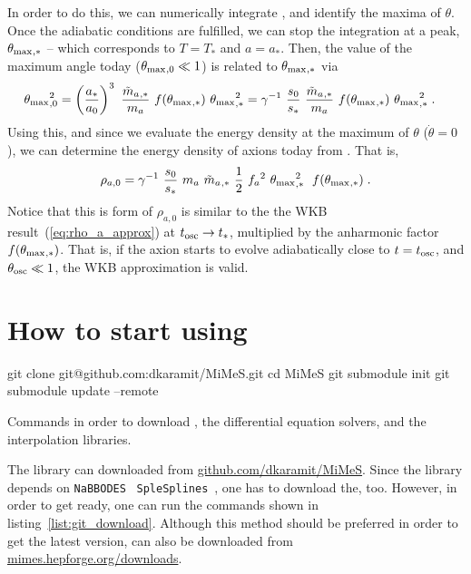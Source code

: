 \documentclass[11pt,a4paper]{article}
\begin{document}
In order to do this, we can numerically integrate , and identify the maxima of $\theta$. Once the adiabatic conditions are fulfilled, we can stop the integration at a peak, $\theta_{\rm max}{}_{,*}$ -- which corresponds to $T=T_{*}$ and $a=a_{*}$. Then, the value of the maximum angle today ($\theta_{\rm max}{}_{,0} \ll 1$) is related to $\theta_{\rm max}{}_{,*}$ via
%
\begin{eqnarray}
	\thetamax_{,0}^2 &=  \lrb{\dfrac{a_*}{a_0}}^3 \ \dfrac{\maT_{,*}}{\ma} \ f(\thetamax_{,*}) \ \thetamax_{,*}^2  =
	\gamma^{-1} \ \dfrac{s_0}{s_*} \ \dfrac{\maT_{,*}}{\ma} \ f(\thetamax_{,*}) \ \thetamax_{,*}^2 
	\; .
	\label{eq:theta_relation}
\end{eqnarray}
%
Using this, and since we evaluate the energy density at the maximum of $\theta$ (\ie $\dot \theta = 0$), we can determine the energy density of axions today from . That is,
%
\begin{equation}
	\rho_{a,0} = \gamma^{-1} \ \dfrac{s_0}{s_*} \ \ma \ \maT_{,*} \ \dfrac{1}{2} \ \fa^2 \ \thetamax_{,*}^2 \;  \ f(\thetamax_{,*}) \;.
	\label{eq:rho_axion_exact}
\end{equation}
%
Notice that this is form of $\rho_{a,0}$  is similar to the the WKB result~(\ref{eq:rho_a_approx}) at $t_{\rm osc}{} \to t_*$, multiplied by the anharmonic factor $f(\theta_{\rm max}{}_{,*})$. That is, if the axion starts to evolve adiabatically close to $t=t_{\rm osc}{}$, and $\theta_{\rm osc}{} \ll 1$, the WKB approximation is valid.






\section{How to start using \mimes}\label{sec:start}
\setcounter{equation}{0}
%
\begin{listing}
	\begin{bash}
		git clone git@github.com:dkaramit/MiMeS.git
		cd MiMeS
		git submodule init
		git submodule update --remote
	\end{bash}
	\caption{Commands in order to download \mimes, the differential equation solvers, and the interpolation libraries.}
	\label{list:git_download}
\end{listing}
%
The library can downloaded from \href{https://github.com/dkaramit/MiMeS}{github.com/dkaramit/MiMeS}. Since the library depends on {\tt NaBBODES}~\cite{NaBBODES} {\tt SpleSplines}~\cite{SimpleSplines}, one has to download the, too. However, in order to get \mimes ready, one can run the commands shown in listing~\ref{list:git_download}. Although this method should be preferred in order to get the latest version, \mimes can also be downloaded from \href{https://mimes.hepforge.org/downloads/}{mimes.hepforge.org/downloads}.
\end{document}
